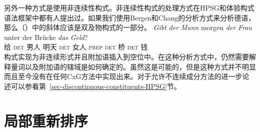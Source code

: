 另外一种方式是使用非连续性构式。非连续性构式的处理方式在HPSG\citep{Reape94a}和体验构式语法\citep{BC2005a}框架中都有人提出过。如果我们使用Bergen和Chang的分析方式来分析德语，那么（）中的斜体应该是双及物构式的一部分。
\ea
\gll \emph{Gibt} \emph{der} \emph{Mann} morgen \emph{der} \emph{Frau} unter der Brücke \emph{das} \emph{Geld}?\\
	 给 \textsc{det} 男人 明天 \textsc{det} 女人 \textsc{prep} \textsc{det} 桥 \textsc{det} 钱\\
\z
构式实现为非连续形式并且附加语插入到空位中。在这种分析方式中，仍然需要解释量词以及附加语的辖域是如何确定的。虽然这是可能的，但是这种方式并不明显而且至今没有在任何CxG方法中实现出来。对于允许不连续成分方法的进一步论述可以参看第~\ref{sec-discontinuous-constituents-HPSG}节。

\section{局部重新排序}

